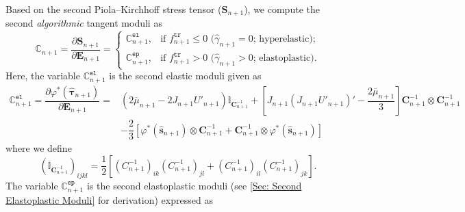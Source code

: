 \documentclass[preprint,11pt]{elsarticle}
\theoremstyle{definition}
\begin{document}
Based on the second Piola--Kirchhoff stress tensor ($\mathbf{S}_{n+1}$), we compute the second \textit{algorithmic} tangent moduli as
\begin{equation} \label{Second Algorithmic Tangent Moduli Initial}
    \mathbb{C}_{n+1} = \dfrac{\partial \mathbf{S}_{n+1}}{\partial \mathbf{E}_{n+1}} = \left\{ \begin{array}{cc}
        \mathbb{C}_{n+1}^\texttt{el}, & \text{if $f_{n+1}^\texttt{tr} \leq 0$ ($\widehat{\gamma}_{n+1} = 0$; hyperelastic)}; \\[12pt]
        \mathbb{C}_{n+1}^\texttt{ep}, & \text{if $f_{n+1}^\texttt{tr} > 0$ ($\widehat{\gamma}_{n+1} > 0$; elastoplastic)}.
    \end{array} \right.
\end{equation}
Here, the variable $\mathbb{C}_{n+1}^\texttt{el}$ is the second elastic moduli given as
\begin{equation} \label{Second Elastic Moduli}
    \begin{array}{ll}
        \mathbb{C}_{n+1}^\texttt{el} = \dfrac{\partial \varphi^*(\widehat{\boldsymbol{\tau}}_{n+1})}{\partial \mathbf{E}_{n+1}}
        = &\left( 2 \overline{\mu}_{n+1} - 2 J_{n+1} U'_{n+1} \right) \mathbb{I}_{\mathbf{C}_{n+1}^{-1}}
        + \left[ J_{n+1} (J_{n+1} U'_{n+1})'- \dfrac{2 \overline{\mu}_{n+1}}{3} \right] \mathbf{C}_{n+1}^{-1} \otimes \mathbf{C}_{n+1}^{-1} \\[12pt]
        &- \dfrac{2}{3} \left[ \varphi^* \left( \widehat{\mathbf{s}}_{n+1} \right) \otimes \mathbf{C}_{n+1}^{-1}
        + \mathbf{C}_{n+1}^{-1} \otimes \varphi^* \left( \widehat{\mathbf{s}}_{n+1} \right) \right]
    \end{array}
\end{equation}
where we define
\begin{equation*}
    \left( \mathbb{I}_{\mathbf{C}_{n+1}^{-1}} \right)_{ijkl} = \dfrac{1}{2} \left[ \left( C_{n+1}^{-1} \right)_{ik} \left( C_{n+1}^{-1} \right)_{jl} + \left( C_{n+1}^{-1} \right)_{il} \left( C_{n+1}^{-1} \right)_{jk} \right].
\end{equation*}
The variable $\mathbb{C}_{n+1}^\texttt{ep}$ is the second elastoplastic moduli (see \ref{Sec: Second Elastoplastic Moduli} for derivation) expressed as
\end{document}
